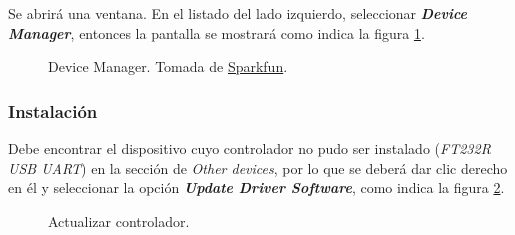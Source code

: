 Se abrirá una ventana. En el listado del lado izquierdo, seleccionar \textit{\textbf{Device Manager}}, entonces la pantalla se mostrará como indica la figura \ref{fig:DevMan}.

\begin{figure}[H] %
\caption[1]{Device Manager. Tomada de \href{https://learn.sparkfun.com/tutorials/how-to-install-ftdi-drivers/all}{Sparkfun}\footnotemark.}
\label{fig:DevMan}
\end{figure}


\subsubsection{Instalación}\label{subsubsec:loop}

Debe encontrar el dispositivo cuyo controlador no pudo ser instalado (\textit{FT232R USB UART}) en la sección de \textit{Other devices}, por lo que se deberá dar clic derecho en él y seleccionar la opción \textit{\textbf{Update Driver Software}}, como indica la figura \ref{fig:DevMan2}.\label{subsec:st}

\begin{figure}[H] %
\caption[1]{Actualizar controlador.}
\label{fig:DevMan2}
\end{figure}

